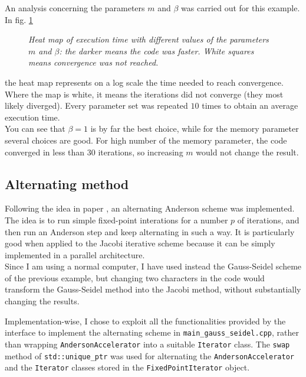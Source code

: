 \documentclass[12pt]{article}
\begin{document}
			An analysis concerning the parameters $m$ and $\beta$ was carried out for this example. In fig. \ref{fig:Heat}
			\begin{figure}
			{\scriptsize
			}
			\centering
			\caption{\textit{Heat map of execution time with different values of the parameters $m$ and $\beta$: the darker means the code was faster. White squares means
			convergence was not reached.}}
			\label{fig:Heat}
			\end{figure}
			the heat map represents on a log scale the time needed to reach convergence.
			Where the map is white, it means the iterations did not converge (they most likely
			diverged). Every parameter set was repeated $10$ times to obtain an average execution time.\\
			You can see that $\beta=1$ is by far the best choice, while for the memory parameter
			several choices are good. For high number of the memory parameter, the code converged in less than
			$30$	iterations, so increasing $m$ would not change the result.
			
			
		\subsection{Alternating method}
			Following the idea in paper \cite{Pratapa}, an alternating Anderson scheme was implemented.\\
			The idea is to run simple fixed-point interations for a number $p$ of iterations, and then run
			an Anderson step and keep alternating in such a way. It is particularly good when applied
			to the Jacobi iterative scheme because it can be simply implemented
			in a parallel architecture.\\
			Since I am using a normal computer, I have used instead the Gauss-Seidel scheme of the previous example,
			but changing two characters in the code would transform the Gauss-Seidel method into the Jacobi method,
			without substantially changing the results.
			
			Implementation-wise, I chose to exploit all the functionalities provided by the interface
			to implement the alternating scheme in	\verb|main_gauss_seidel.cpp|, rather than
			wrapping \verb|AndersonAccelerator| into a suitable \verb|Iterator| class. 
			The \verb|swap| method of \verb|std::unique_ptr| was used for alternating the \verb|AndersonAccelerator|
			and the \verb|Iterator| classes stored in the \verb|FixedPointIterator| object.

		\pagebreak			
			\printbibliography[heading=bibintoc,
			title={Bibliography}]
						
					
	
\end{document}
